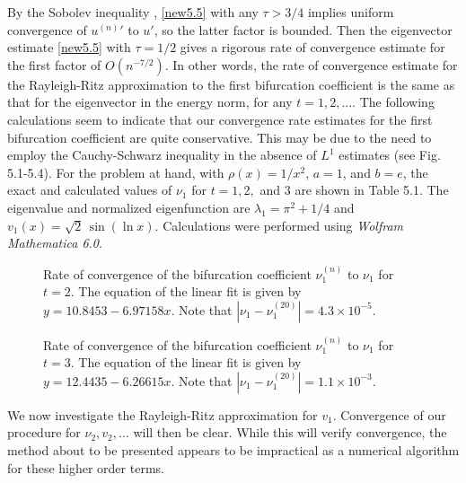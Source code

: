 \documentclass[final]{siamltex}
\numberwithin{equation}{section}
\begin{document}
By the Sobolev inequality \cite{Grisvard2}, \eqref{new5.5} with any
$\tau >3/4$ implies uniform convergence of ${u^{(n)}}'$ to $u'$, so
the latter factor is bounded. Then the eigenvector estimate
\eqref{new5.5} with $\tau=1/2$ gives a rigorous rate of convergence
estimate for the first factor of $O(n^{-7/2})$. In other words, the
rate of convergence estimate for the Rayleigh-Ritz approximation to
the first bifurcation coefficient is the same as that for the
eigenvector in the energy norm, for any $t=1,2, \ldots$. The
following calculations seem to indicate that our convergence rate
estimates for the first bifurcation coefficient are quite
conservative. This may be due to the need to employ the
Cauchy-Schwarz inequality in the absence of $L^1$ estimates (see
Fig. 5.1-5.4). For the problem at hand, with $\rho(x)=1/x^2$, $a=1$, and $b=e$, 
the exact and calculated values of $\nu_1$ for $t=1, 2,$ and $3$ are shown in Table 5.1. The eigenvalue and normalized eigenfunction are $\lambda_1=\pi^2+1/4$ and $v_1(x)=\sqrt{2} \, \sin\left(\ln x \right)$. Calculations were performed using {\em Wolfram Mathematica 6.0}.

\begin{figure}[tbp19!]
\begin{center}
\caption{Rate of convergence of the bifurcation coefficient $\nu_1^{(n)}$ to $\nu_1$ for $t=2$. The equation of the linear fit is given by $y=10.8453-6.97158 x$. Note that $|\nu_1-\nu_1^{(20)}|=4.3 \times 10^{-5}$.}
\end{center}
    \end{figure}
    
    \begin{figure}[tp19!]
\begin{center}
\caption{Rate of convergence of the bifurcation coefficient $\nu_1^{(n)}$ to $\nu_1$ for $t=3$. The equation of the linear fit is given by $y=12.4435-6.26615 x$. Note that $|\nu_1-\nu_1^{(20)}|=1.1 \times 10^{-3}$.}
\end{center}
     \end{figure}

We now investigate the Rayleigh-Ritz approximation for $v_1$. Convergence of our procedure for $\nu_2, v_2, \ldots$ will then be clear. While this will verify convergence, the method about to be presented appears to be impractical as a numerical algorithm for these higher order terms.
\end{document}

